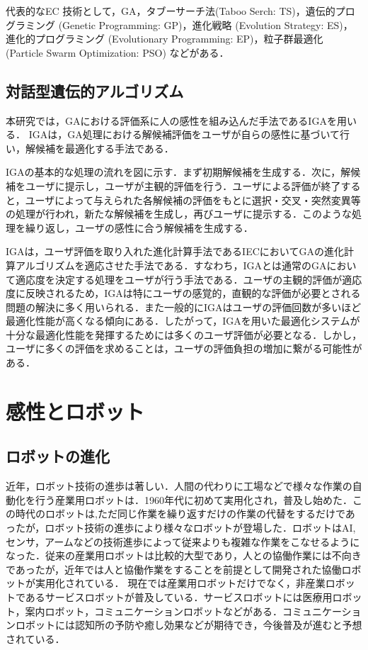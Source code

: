 代表的なEC 技術として，GA，タブーサーチ法(Taboo Serch: TS)，遺伝的プログラミング (Genetic Programming: GP)，進化戦略 (Evolution Strategy: ES)，進化的プログラミング (Evolutionary Programming: EP)，粒子群最適化 (Particle Swarm Optimization: PSO) などがある．
    
\subsection{対話型遺伝的アルゴリズム}
\label{sec2.2.2}

本研究では，GAにおける評価系に人の感性を組み込んだ手法であるIGAを用いる．
IGAは，GA処理における解候補評価をユーザが自らの感性に基づいて行い，解候補を最適化する手法である．

IGAの基本的な処理の流れを図に示す．まず初期解候補を生成する．次に，解候補をユーザに提示し，ユーザが主観的評価を行う．ユーザによる評価が終了すると，ユーザによって与えられた各解候補の評価をもとに選択・交叉・突然変異等の処理が行われ，新たな解候補を生成し，再びユーザに提示する．このような処理を繰り返し，ユーザの感性に合う解候補を生成する．

IGAは，ユーザ評価を取り入れた進化計算手法であるIECにおいてGAの進化計算アルゴリズムを適応させた手法である．すなわち，IGAとは通常のGAにおいて適応度を決定する処理をユーザが行う手法である．ユーザの主観的評価が適応度に反映されるため，IGAは特にユーザの感覚的，直観的な評価が必要とされる問題の解決に多く用いられる．また一般的にIGAはユーザの評価回数が多いほど最適化性能が高くなる傾向にある．したがって，IGAを用いた最適化システムが十分な最適化性能を発揮するためには多くのユーザ評価が必要となる．しかし，ユーザに多くの評価を求めることは，ユーザの評価負担の増加に繋がる可能性がある．



\newpage

\section{感性とロボット}
\label{sec2.3}

\subsection{ロボットの進化}
\label{sec2.3.1}
近年，ロボット技術の進歩は著しい．人間の代わりに工場などで様々な作業の自動化を行う産業用ロボットは．1960年代に初めて実用化され，普及し始めた．この時代のロボットは,ただ同じ作業を繰り返すだけの作業の代替をするだけであったが，ロボット技術の進歩により様々なロボットが登場した．ロボットはAI,センサ，アームなどの技術進歩によって従来よりも複雑な作業をこなせるようになった．従来の産業用ロボットは比較的大型であり，人との協働作業には不向きであったが，近年では人と協働作業をすることを前提として開発された協働ロボットが実用化されている．
現在では産業用ロボットだけでなく，非産業ロボットであるサービスロボットが普及している．サービスロボットには医療用ロボット，案内ロボット，コミュニケーションロボットなどがある．コミュニケーションロボットには認知所の予防や癒し効果などが期待でき，今後普及が進むと予想されている．


